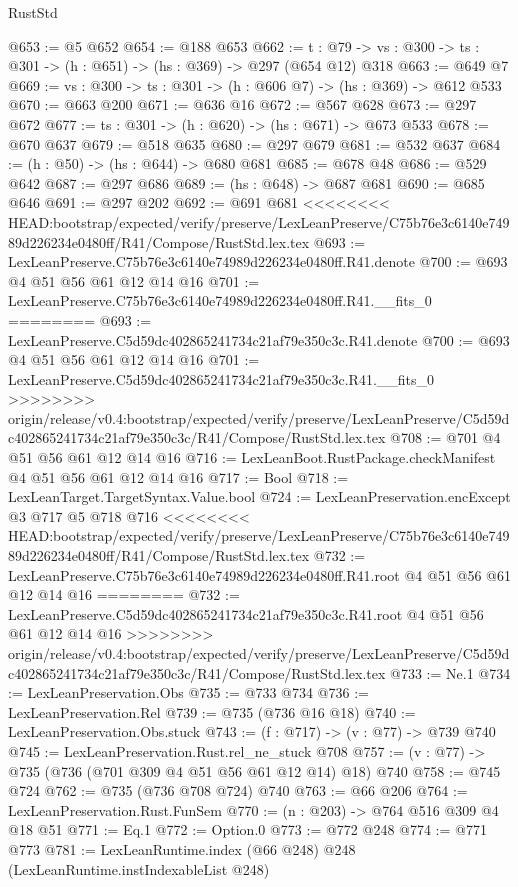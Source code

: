 \begin{lexlean}{RustStd}
\begin{coremodule}
{\begin{coremodule}
@653 := @5 @652
@654 := @188 @653
@662 := {t : @79} -> {vs : @300} -> {ts : @301} -> (h : @651) -> (hs : @369) -> @297 (@654 @12) @318
@663 := @649 @7
@669 := {vs : @300} -> {ts : @301} -> (h : @606 @7) -> (hs : @369) -> @612 @533
@670 := @663 @200
@671 := @636 @16
@672 := @567 @628
@673 := @297 @672
@677 := {ts : @301} -> (h : @620) -> (hs : @671) -> @673 @533
@678 := @670 @637
@679 := @518 @635
@680 := @297 @679
@681 := @532 @637
@684 := (h : @50) -> (hs : @644) -> @680 @681
@685 := @678 @48
@686 := @529 @642
@687 := @297 @686
@689 := (hs : @648) -> @687 @681
@690 := @685 @646
@691 := @297 @202
@692 := @691 @681
<<<<<<<< HEAD:bootstrap/expected/verify/preserve/LexLeanPreserve/C75b76e3c6140e74989d226234e0480ff/R41/Compose/RustStd.lex.tex
@693 := LexLeanPreserve.C75b76e3c6140e74989d226234e0480ff.R41.denote
@700 := @693 @4 @51 @56 @61 @12 @14 @16
@701 := LexLeanPreserve.C75b76e3c6140e74989d226234e0480ff.R41.__fits_0
========
@693 := LexLeanPreserve.C5d59dc402865241734c21af79e350c3c.R41.denote
@700 := @693 @4 @51 @56 @61 @12 @14 @16
@701 := LexLeanPreserve.C5d59dc402865241734c21af79e350c3c.R41.__fits_0
>>>>>>>> origin/release/v0.4:bootstrap/expected/verify/preserve/LexLeanPreserve/C5d59dc402865241734c21af79e350c3c/R41/Compose/RustStd.lex.tex
@708 := @701 @4 @51 @56 @61 @12 @14 @16
@716 := LexLeanBoot.RustPackage.checkManifest @4 @51 @56 @61 @12 @14 @16
@717 := Bool
@718 := LexLeanTarget.TargetSyntax.Value.bool
@724 := LexLeanPreservation.encExcept @3 @717 @5 @718 @716
<<<<<<<< HEAD:bootstrap/expected/verify/preserve/LexLeanPreserve/C75b76e3c6140e74989d226234e0480ff/R41/Compose/RustStd.lex.tex
@732 := LexLeanPreserve.C75b76e3c6140e74989d226234e0480ff.R41.root @4 @51 @56 @61 @12 @14 @16
========
@732 := LexLeanPreserve.C5d59dc402865241734c21af79e350c3c.R41.root @4 @51 @56 @61 @12 @14 @16
>>>>>>>> origin/release/v0.4:bootstrap/expected/verify/preserve/LexLeanPreserve/C5d59dc402865241734c21af79e350c3c/R41/Compose/RustStd.lex.tex
@733 := Ne.{1}
@734 := LexLeanPreservation.Obs
@735 := @733 @734
@736 := LexLeanPreservation.Rel
@739 := @735 (@736 @16 @18)
@740 := LexLeanPreservation.Obs.stuck
@743 := (f : @717) -> (v : @77) -> @739 @740
@745 := LexLeanPreservation.Rust.rel_ne_stuck @708
@757 := (v : @77) -> @735 (@736 (@701 @309 @4 @51 @56 @61 @12 @14) @18) @740
@758 := @745 @724
@762 := @735 (@736 @708 @724) @740
@763 := @66 @206
@764 := LexLeanPreservation.Rust.FunSem
@770 := (n : @203) -> @764 @516 @309 @4 @18 @51
@771 := Eq.{1}
@772 := Option.{0}
@773 := @772 @248
@774 := @771 @773
@781 := LexLeanRuntime.index (@66 @248) @248 (LexLeanRuntime.instIndexableList @248)

\end{coremodule}}
\end{coremodule}
\end{lexlean}
